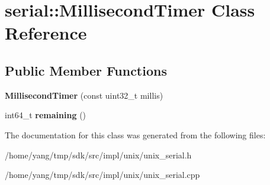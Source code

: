 \hypertarget{classserial_1_1_millisecond_timer}{}\section{serial\+:\+:Millisecond\+Timer Class Reference}
\label{classserial_1_1_millisecond_timer}
\subsection*{Public Member Functions}
\begin{DoxyCompactItemize}
\item 
{\bfseries Millisecond\+Timer} (const uint32\+\_\+t millis)\hypertarget{classserial_1_1_millisecond_timer_ac0f79f50e2859270bb1cb556377aee40}{}\label{classserial_1_1_millisecond_timer_ac0f79f50e2859270bb1cb556377aee40}

\item 
int64\+\_\+t {\bfseries remaining} ()\hypertarget{classserial_1_1_millisecond_timer_acb4d4e685a06fc7a2c24c90ac0970e35}{}\label{classserial_1_1_millisecond_timer_acb4d4e685a06fc7a2c24c90ac0970e35}

\end{DoxyCompactItemize}


The documentation for this class was generated from the following files\+:\begin{DoxyCompactItemize}
\item 
/home/yang/tmp/sdk/src/impl/unix/unix\+\_\+serial.\+h\item 
/home/yang/tmp/sdk/src/impl/unix/unix\+\_\+serial.\+cpp\end{DoxyCompactItemize}
